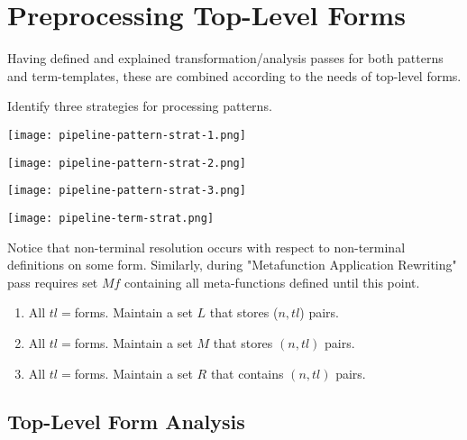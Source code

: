 \section{Preprocessing Top-Level Forms}

Having defined and explained transformation/analysis passes for both patterns and term-templates, these are combined according to the needs of top-level forms.

Identify three strategies for processing patterns.

\texttt{[image: pipeline-pattern-strat-1.png]}

\texttt{[image: pipeline-pattern-strat-2.png]}

\texttt{[image: pipeline-pattern-strat-3.png]}

\texttt{[image: pipeline-term-strat.png]}

Notice that non-terminal resolution occurs with respect to non-terminal definitions on some \DefineLanguageNoArg form. Similarly, during "Metafunction Application Rewriting" pass requires set $Mf$ containing all meta-functions defined until this point. 

\begin{enumerate}
\item All $tl=$\TlDefineLanguage \space forms. Maintain a set $L$ that stores ($n, tl$) pairs.
\item All $tl=$\TlDefineMetafunction \space forms. Maintain a set $M$ that stores $(n, tl)$ pairs.
\item All $tl=$\TlDefineReductionRelation \space forms. Maintain a set $R$ that contains $(n, tl)$ pairs.
\end{enumerate}

\subsection{Top-Level Form Analysis}

